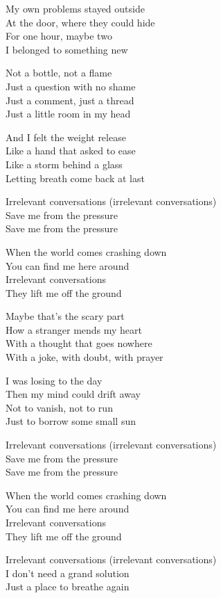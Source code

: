 \begin{lyrics}
My own problems stayed outside\\
At the door, where they could hide\\
For one hour, maybe two\\
I belonged to something new

Not a bottle, not a flame\\
Just a question with no shame\\
Just a comment, just a thread\\
Just a little room in my head

And I felt the weight release\\
Like a hand that asked to ease\\
Like a storm behind a glass\\
Letting breath come back at last

Irrelevant conversations
(irrelevant conversations)\\
Save me from the pressure\\
Save me from the pressure

When the world comes crashing down\\
You can find me here around\\
Irrelevant conversations\\
They lift me off the ground

Maybe that’s the scary part\\
How a stranger mends my heart\\
With a thought that goes nowhere\\
With a joke, with doubt, with prayer

I was losing to the day\\
Then my mind could drift away\\
Not to vanish, not to run\\
Just to borrow some small sun

Irrelevant conversations
(irrelevant conversations)\\
Save me from the pressure\\
Save me from the pressure

When the world comes crashing down\\
You can find me here around\\
Irrelevant conversations\\
They lift me off the ground

Irrelevant conversations
(irrelevant conversations)\\
I don’t need a grand solution\\
Just a place to breathe again
\end{lyrics}

